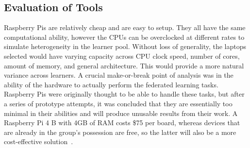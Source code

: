\documentclass[../mthe-493-final-project.tex]{subfiles}
\begin{document}
    \subsection{Evaluation of Tools}
    \label{subsec-ete-evaluation-of-tools}
    Raspberry Pis are relatively cheap and are easy to setup. They all have the same computational ability, however the CPUs can be overclocked at different rates to simulate heterogeneity in the learner pool. Without loss of generality, the laptops selected would have varying capacity across CPU clock speed, number of cores, amount of memory, and general architecture. This would provide a more natural variance across learners. A crucial make-or-break point of analysis was in the ability of the hardware to actually perform the federated learning tasks. Raspberry Pis were originally thought to be able to handle these tasks, but after a series of prototype attempts, it was concluded that they are essentially too minimal in their abilities and will produce unusable results from their work. A Raspberry Pi 4 B with 4GB of RAM costs \$75 per board, whereas devices that are already in the group's possession are free, so the latter will also be a more cost-effective solution~\cite{raspberry-pi-price}.
    
\end{document}
